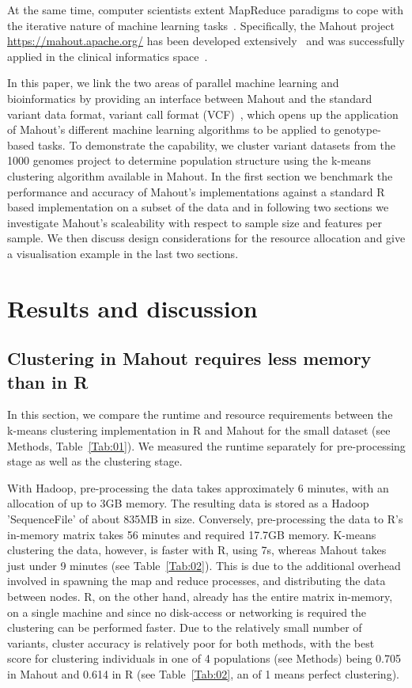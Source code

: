 \documentclass{bioinfo}
\begin{document}
At the same time, computer scientists extent MapReduce paradigms to cope with the iterative nature of machine learning tasks~\citep{Chu2009}. Specifically, the Mahout project \url{https://mahout.apache.org/} has been developed extensively~\citep{Ranger2007, Owen2011} and was successfully applied in the clinical informatics space~\citep{Dong2013}.

In this paper, we link the two areas of parallel machine learning and bioinformatics by providing an interface between Mahout and the standard variant data format, variant call format (VCF)~\citep{1KG2012}, which opens up the application of Mahout's different machine learning algorithms to be applied to genotype-based tasks. 
To demonstrate the capability, we cluster variant datasets from the 1000 genomes project to determine population structure using the k-means clustering algorithm available in Mahout. In the first section we benchmark the performance and accuracy of Mahout's implementations against a standard R based implementation on a subset of the data and in following two sections we investigate Mahout's scaleability with respect to sample size and features per sample. We then discuss design considerations for the resource allocation and give a visualisation example in the last two sections.  

\section*{Results and discussion}

\subsection*{Clustering in Mahout requires less memory than in R}
In this section, we compare the runtime and resource requirements between the k-means clustering implementation in R and Mahout for the small \NinteenPhaseone{} dataset (see Methods, Table~\ref{Tab:01}). 
We measured the runtime separately for pre-processing stage as well as the clustering stage. 

With Hadoop, pre-processing the data takes approximately 6 minutes, with an allocation of up to 3GB memory. 
The resulting data is stored as a Hadoop 'SequenceFile' of about 835MB in size.
Conversely,  pre-processing the data to R's in-memory matrix takes 56 minutes and required 17.7GB memory. 
K-means clustering the data, however, is faster with R, using 7s, whereas Mahout takes just under 9 minutes (see Table~\ref{Tab:02}). 
This is due to the additional overhead involved in spawning the map and reduce processes, and distributing the data between nodes.
R, on the other hand, already has the entire matrix in-memory, on a single machine and since no disk-access or networking is required the clustering can be performed faster. 
Due to the relatively small number of variants, cluster accuracy is relatively poor for both methods, with the best \ARI{}~\citep{Hubert1985} score for clustering individuals in one of 4 populations (see Methods) being 0.705 in Mahout and 0.614 in R (see Table~\ref{Tab:02}, an \ARI{} of 1 means perfect clustering).
\end{document}

